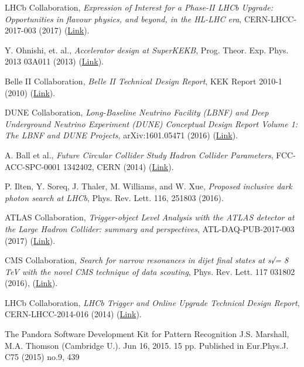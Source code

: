 \documentclass[11pt,letterpaper,fleqn]{article}
\begin{document}
\begin{thebibliography}{99}
LHCb Collaboration, 
\textit{Expression of Interest for a Phase-II LHCb Upgrade: Opportunities in flavour physics, and beyond, in the HL-LHC era},  
CERN-LHCC-2017-003 (2017) (\href{https://cds.cern.ch/record/2244311}{Link}).
  
Y. Ohnishi, et. al., 
\textit{Accelerator design at SuperKEKB}, 
Prog. Theor. Exp. Phys. 2013 03A011 (2013) (\href{http://dx.doi.org/10.1093/ptep/pts083}{Link}). 

Belle II Collaboration, 
\textit{Belle II Technical Design Report}, 
KEK Report 2010-1 (2010) (\href{https://arxiv.org/abs/1011.0352}{Link}).

DUNE Collaboration, 
\textit{Long-Baseline Neutrino Facility (LBNF) and Deep Underground Neutrino Experiment (DUNE) Conceptual Design Report Volume 1: The LBNF and DUNE Projects}, 
arXiv:1601.05471 (2016) (\href{https://arxiv.org/abs/1601.05471}{Link}). 

A. Ball et al., 
\textit{Future Circular Collider Study Hadron Collider Parameters}, 
FCC-ACC-SPC-0001 1342402, CERN (2014) (\href{https://indico.cern.ch/event/298180/contributions/1658149/attachments/560575/772288/FCC-1401101315-DSC_HadronColliderParameters_V0.3.pdf}{Link}).

P. Ilten, Y. Soreq, J. Thaler, M. Williams, and W. Xue, 
\textit{Proposed inclusive dark photon search at LHCb}, 
Phys. Rev. Lett. 116, 251803 (2016). 

ATLAS Collaboration,
\textit{Trigger-object Level Analysis with the ATLAS detector at the Large Hadron Collider: summary and perspectives}, 
ATL-DAQ-PUB-2017-003 (2017) (\href{https://cds.cern.ch/record/2295739}{Link}).

CMS Collaboration,
\textit{Search for narrow resonances in dijet final states at s√= 8 TeV with the novel CMS technique of data scouting},
Phys. Rev. Lett. 117 031802 (2016), (\href{https://cds.cern.ch/record/2149625}{Link}). 

LHCb Collaboration, 
\textit{LHCb Trigger and Online Upgrade Technical Design Report},
CERN-LHCC-2014-016 (2014) (\href{https://cds.cern.ch/record/1701361}{Link}).

 The Pandora Software Development Kit for Pattern Recognition
J.S. Marshall, M.A. Thomson (Cambridge U.). Jun 16, 2015. 15 pp.
Published in Eur.Phys.J. C75 (2015) no.9, 439


\end{thebibliography}
\end{document}
